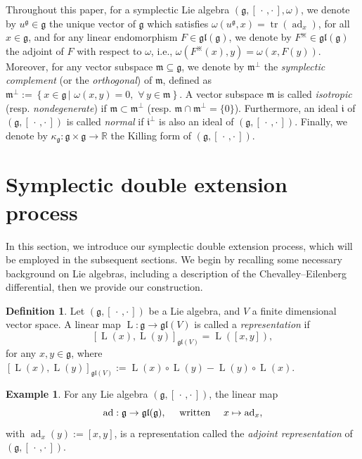 \documentclass[final,1p,times,nopreprintline]{elsarticle}
\theoremstyle{definition}
\newtheorem{example}{Example}[section]
\newtheorem{definition}{Definition}[section]
\numberwithin{equation}{section}
\newcommand{\ro}{\circ}
\newcommand{\rel}{\mathbb{R}}
\newcommand{\w}{\omega}
\newcommand{\tr}{\operatorname{tr}}
\newcommand{\g}{\mathfrak{g}}
\newcommand{\ad}{\operatorname{ad}}
\newcommand{\LS}{\operatorname{L}}
\numberwithin{equation}{section}
\newcommand{\ii}{\mathfrak{i}}
\newcommand{\gl}{\mathfrak{gl}}
\newcommand{\cro}{[\,\cdot\,,\cdot\,]}
\begin{document}
Throughout this paper, for a symplectic Lie algebra $(\g,[\,\cdot\,,\cdot\,],\w)$, we denote by $u^\mathfrak{g}\in\mathfrak{g}$ the unique vector of $\mathfrak{g}$ which satisfies $\omega\left(u^\mathfrak{g},x\right)=\tr\left(\ad_x\right)$, for all $x\in\mathfrak{g}$, and for any linear endomorphism $F\in\gl(\mathfrak{\g})$, we denote by $F^\divideontimes\in\gl(\mathfrak{g})$ the adjoint of $F$ with respect to $\omega$, i.e., $\omega(F^\divideontimes(x),y)=\omega(x,F(y))$. Moreover, for any vector subspace $\mathfrak{m}\subseteq\g$, we denote by $\mathfrak{m}^\perp$ the \textit{symplectic complement} (or the \textit{orthogonal}) of $\mathfrak{m}$, defined as $\mathfrak{m}^\perp:=\left\{x\in\g\,|\,\,\w(x,y)=0,\,\,\forall\,y\in\mathfrak{m}\right\}$. A vector subspace $\mathfrak{m}$ is called \textit{isotropic} (resp. \textit{nondegenerate}) if $\mathfrak{m}\subset\mathfrak{m}^\perp$ (resp. $\mathfrak{m}\cap\mathfrak{m}^\perp=\{0\}$). Furthermore, an ideal $\ii$ of $(\g,\cro)$ is called \textit{normal} if $\ii^\perp$ is also an ideal of $(\g,\cro)$. Finally, we denote by $\kappa_\g:\g\times\g\to\rel$ the Killing form of $(\g,\cro)$.

\section{Symplectic double extension process}\label{Section00}

In this section, we introduce our symplectic double extension process, which will be employed in the subsequent sections. We begin by recalling some necessary background on Lie algebras, including a description of the Chevalley–Eilenberg differential, then we provide our construction.

\begin{definition}
Let $(\g,\cro)$ be a Lie algebra, and $V$ a finite dimensional vector space. A linear map $\LS:\g\to\gl(V)$ is called a \textit{representation} if 
\begin{equation*}
\left[\LS(x),\LS(y)\right]_{\gl(V)}=\LS([x,y]),
\end{equation*}
for any $x,y\in\g$, where $\left[\LS(x),\LS(y)\right]_{\gl(V)}:=\LS(x)\ro\LS(y)-\LS(y)\ro\LS(x)$.
\end{definition}

\begin{example}
For any Lie algebra $(\g,\cro)$, the linear map
\begin{equation*}
\ad:\g\to\gl(\g),\quad\textnormal{ written }\quad x\mapsto \ad_x,
\end{equation*}
with $\ad_x(y):=[x,y]$, is a representation called the \textit{adjoint representation} of $(\g,\cro)$.
\end{example}
\end{document}

